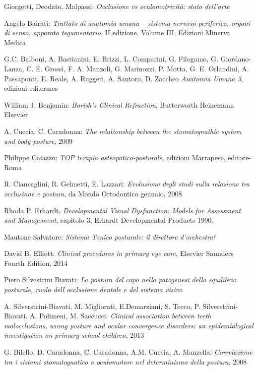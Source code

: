 \begin{thebibliography}{9}

Giorgetti, Deodato, Malpassi: \emph{Occlusione vs oculomotricità: stato dell’arte}

Angelo Bairati: \emph{Trattato di anatomia umana – sistema nervoso periferico, organi di senso, apparato tegumentario}, II edizione, Volume III, Edizioni Minerva Medica

G.C. Balboni, A. Bastianini, E. Brizzi, L. Comparini, G. Filogamo, G. Giordano-Lanza, C. E. Grossi, F. A. Manzoli, G. Marinozzi, P. Motta, G. E. Orlandini, A. Passaponti, E. Reale, A. Ruggeri, A. Santoro, D. Zaccheo \emph{Anatomia Umana 3}, edizioni edi.ermes

William J. Benjamin: \emph{Borish’s Clinical Refraction}, Butterworth Heinemann Elsevier

A. Cuccia, C. Caradonna: \emph{The relationship between the stomatognathic system and body posture}, 2009

Philippe Caiazzo: \emph{TOP terapia osteopatico-posturale}, edizioni Marrapese, editore-Roma

R. Ciancaglini, R. Gelmetti, E. Lazzari: \emph{Evoluzione degli studi sulla relazione tra occlusione e postura}, da Mondo Ortodontico gennaio, 2008

Rhoda P. Erhardt, \emph{Developmental Visual Dysfunction: Models for Assessment and Management}, capitolo 3, Erhardt Developmental Products 1990.

Mautone Salvatore: \emph{Sistema Tonico posturale: il direttore d’orchestra!}

David B. Elliott: \emph{Clinical procedures in primary eye care}, Elsevier Saunders Fourth Edition, 2014

Piero Silvestrini Biavati: \emph{La postura del capo nella patogenesi dello squilibrio posturale, ruolo dell occlusione dentale e del sistema visivo}

A. Silverstrini-Biavati, M. Migliorati, E.Demarziani, S. Tecco, P. Silverstrini-Biavati. A. Polimeni, M. Saccucci: \emph{Clinical association between teeth malocclusions, wrong posture and ocular convergence disorders: an epidemiological investigation on primary school children}, 2013

G. Bilello, D. Caradonna, C. Caradonna, A.M. Cuccia, A. Manzella: \emph{Correlazione tra i sistemi stomatognatico e oculomotore nel determinismo della postura}, 2008


\end{thebibliography}
